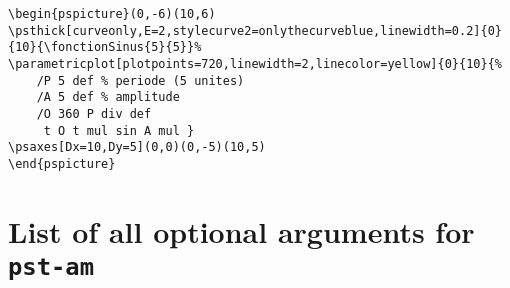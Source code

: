 \documentclass[11pt,english,french,BCOR10mm,DIV12,bibliography=totoc,parskip=false,smallheadings
    headexclude,footexclude,oneside]{pst-doc}
\begin{document}
\begin{lstlisting}
\begin{pspicture}(0,-6)(10,6)
\psthick[curveonly,E=2,stylecurve2=onlythecurveblue,linewidth=0.2]{0}{10}{\fonctionSinus{5}{5}}%
\parametricplot[plotpoints=720,linewidth=2,linecolor=yellow]{0}{10}{%
    /P 5 def % periode (5 unites)
    /A 5 def % amplitude
    /O 360 P div def
     t O t mul sin A mul }
\psaxes[Dx=10,Dy=5](0,0)(0,-5)(10,5)
\end{pspicture}
\end{lstlisting}


\clearpage
\section{List of all optional arguments for \texttt{pst-am}}


\nocite{*}
\bgroup
\RaggedRight


\egroup

\printindex
\end{document}
